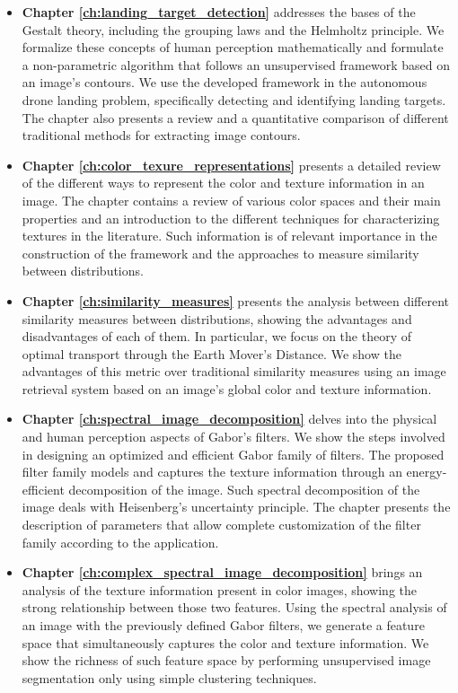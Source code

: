 \begin{itemize}
	\item \textbf{Chapter \ref{ch:landing_target_detection}} addresses the bases of the Gestalt theory, including the grouping laws and the Helmholtz principle. We formalize these concepts of human perception mathematically and formulate a non-parametric algorithm that follows an unsupervised framework based on an image's contours. We use the developed framework in the autonomous drone landing problem, specifically detecting and identifying landing targets.  The chapter also presents a review and a quantitative comparison of different traditional methods for extracting image contours.
	
	\item \textbf{Chapter \ref{ch:color_texure_representations}} presents a detailed review of the different ways to represent the color and texture information in an image. The chapter contains a review of various color spaces and their main properties and an introduction to the different techniques for characterizing textures in the literature. Such information is of relevant importance in the construction of the framework and the approaches to measure similarity between distributions.
	
	\item \textbf{Chapter \ref{ch:similarity_measures}} presents the analysis between different similarity measures between distributions, showing the advantages and disadvantages of each of them. In particular, we focus on the theory of optimal transport through the Earth Mover's Distance. We show the advantages of this metric over traditional similarity measures using an image retrieval system based on an image's global color and texture information.
	
	\item \textbf{Chapter \ref{ch:spectral_image_decomposition}} delves into the physical and human perception aspects of Gabor's filters. We show the steps involved in designing an optimized and efficient Gabor family of filters. The proposed filter family models and captures the texture information through an energy-efficient decomposition of the image. Such spectral decomposition of the image deals with Heisenberg's uncertainty principle. The chapter presents the description of parameters that allow complete customization of the filter family according to the application.
	
	\item \textbf{Chapter \ref{ch:complex_spectral_image_decomposition}} brings an analysis of the texture information present in color images, showing the strong relationship between those two features. Using the spectral analysis of an image with the previously defined Gabor filters, we generate a feature space that simultaneously captures the color and texture information. We show the richness of such feature space by performing unsupervised image segmentation only using simple clustering techniques.
	

\end{itemize}
